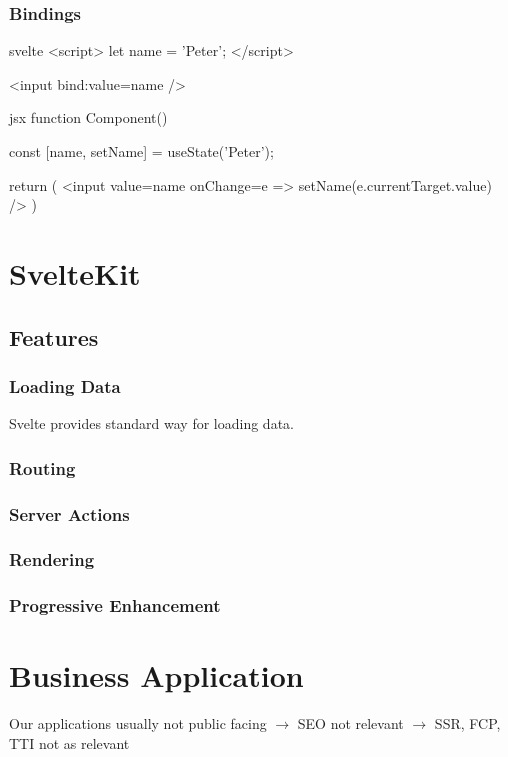 \subsubsection{Bindings}


\begin{myminted}{svelte}{}
<script>
    let name = 'Peter';
</script>

<input bind:value={name} />
\end{myminted}

\begin{myminted}{jsx}{}
function Component() {
    const [name, setName] = useState('Peter');

    return ( 
        <input 
            value={name}
            onChange={e => setName(e.currentTarget.value)} 
        />
    )
}
\end{myminted}

\section{SvelteKit}
\label{sec:sveltekit}


\subsection{Features}

\subsubsection{Loading Data}
\label{sec:sveltekit-loading}

Svelte provides standard way for loading data.

\subsubsection{Routing}

\subsubsection{Server Actions}
\label{sec:sveltekit-server-actions}
 
\subsubsection{Rendering}

\subsubsection{Progressive Enhancement}

\section{Business Application}
\label{sec:business-application}

Our applications usually not public facing $\rightarrow$ SEO not relevant $\rightarrow$ SSR, FCP, TTI not as relevant
